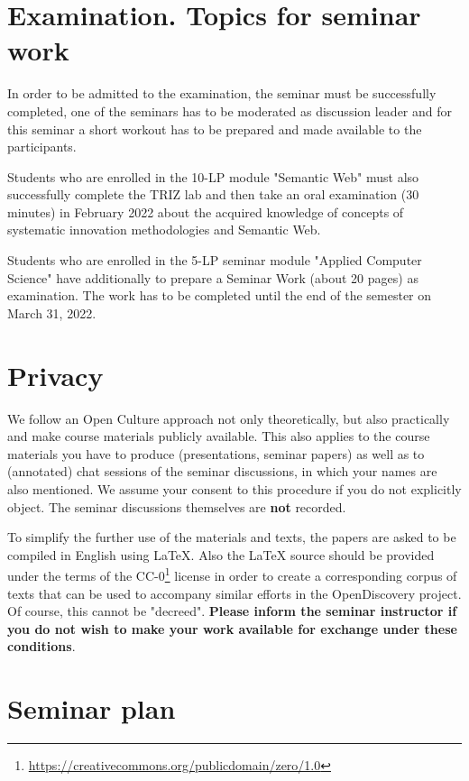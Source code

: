 \documentclass[11pt,a4paper]{article}
\begin{document}
\section{Examination. Topics for seminar work}

In order to be admitted to the examination, the seminar must be successfully
completed, one of the seminars has to be moderated as discussion leader and
for this seminar a short workout has to be prepared and made available to the
participants.

Students who are enrolled in the 10-LP module "Semantic Web" must also
successfully complete the TRIZ lab and then take an oral examination (30
minutes) in February 2022 about the acquired knowledge of concepts of
systematic innovation methodologies and Semantic Web.

Students who are enrolled in the 5-LP seminar module "Applied Computer
Science" have additionally to prepare a Seminar Work (about 20 pages) as
examination.  The work has to be completed until the end of the semester on
March 31, 2022.

\section{Privacy}

We follow an Open Culture approach not only theoretically, but also
practically and make course materials publicly available.  This also applies
to the course materials you have to produce (presentations, seminar papers) as
well as to (annotated) chat sessions of the seminar discussions, in which your
names are also mentioned.  We assume your consent to this procedure if you do
not explicitly object.  The seminar discussions themselves are \textbf{not}
recorded.

To simplify the further use of the materials and texts, the papers are asked
to be compiled in English using {\LaTeX}.  Also the {\LaTeX} source should be
provided under the terms of the
CC-0\footnote{\url{https://creativecommons.org/publicdomain/zero/1.0}} license
in order to create a corresponding corpus of texts that can be used to
accompany similar efforts in the OpenDiscovery project. Of course, this cannot
be "decreed". \textbf{Please inform the seminar instructor if you do not wish
  to make your work available for exchange under these conditions}.

\section{Seminar plan}
\end{document}
